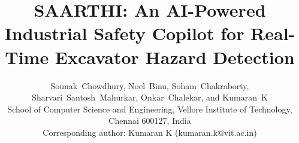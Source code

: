 \documentclass[journal]{IEEEtran}
\begin{document}

\title{SAARTHI: An AI-Powered Industrial Safety Copilot for Real-Time Excavator Hazard Detection}


\author{
Sounak~Chowdhury,
Noel~Binu,
Soham~Chakraborty,
Sharvari~Santosh~Mahurkar,
Onkar~Chalekar, 
and Kumaran~K\\
\vspace{0.5em}
\normalsize School of Computer Science and Engineering, Vellore Institute of Technology, Chennai 600127, India\\
\normalsize Corresponding author: Kumaran K (kumaran.k@vit.ac.in)
}

\maketitle































\nocite{*}


\end{document}
